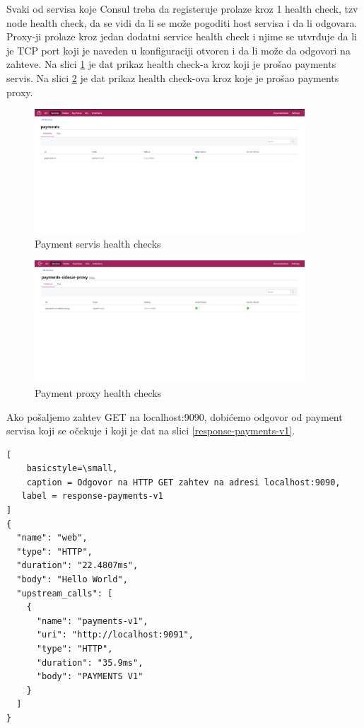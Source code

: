 \documentclass[a4paper,12pt]{report}
\begin{document}
Svaki od servisa koje Consul treba da registeruje prolaze kroz 1 health check, tzv node health check, da se vidi da li se može pogoditi host servisa i da li odgovara. Proxy-ji prolaze kroz jedan dodatni service health check i njime se  utvrđuje da li je TCP port koji je naveden u konfiguraciji otvoren i da li može da odgovori na zahteve. Na slici \ref{fig:service-health-check} je dat prikaz health check-a kroz koji je prošao payments servis. Na slici \ref{fig:proxy-health-check} je dat prikaz health check-ova kroz koje je prošao payments proxy. \newline

\begin{figure}[h]
    \centering
    \includegraphics[width=0.9\textwidth]{service_health_check}
    \caption{Payment servis health checks}
    \label{fig:service-health-check}
\end{figure} 

\begin{figure}[h]
    \centering
    \includegraphics[width=0.9\textwidth]{proxy_health_check}
    \caption{Payment proxy health checks}
    \label{fig:proxy-health-check}
\end{figure}

Ako pošaljemo zahtev GET na localhost:9090, dobićemo odgovor od payment servisa koji se očekuje i koji je dat na slici \ref{response-payments-v1}. \newline

\begin{lstlisting}[
    basicstyle=\small,
    caption = Odgovor na HTTP GET zahtev na adresi localhost:9090, 
   label = response-payments-v1
]
{
  "name": "web",
  "type": "HTTP",
  "duration": "22.4807ms",
  "body": "Hello World",
  "upstream_calls": [
    {
      "name": "payments-v1",
      "uri": "http://localhost:9091",
      "type": "HTTP",
      "duration": "35.9ms",
      "body": "PAYMENTS V1"
    }
  ]
}
\end{lstlisting}
\end{document}
